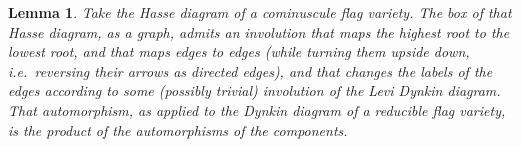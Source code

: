 \documentclass[a4paper,10pt]{amsart}
\newtheorem{lemma}{Lemma}
\theoremstyle{remark}
\begin{document}
\begin{lemma}
Take the Hasse diagram of a cominuscule flag variety.
The box of that Hasse diagram, as a graph, admits an involution that maps the highest root to the lowest root, and that maps edges to edges (while turning them upside down, i.e.\ reversing their arrows as directed edges), and that changes the labels of the edges according to some (possibly trivial) involution of the Levi Dynkin diagram. 
That automorphism, as applied to the Dynkin diagram of a reducible flag variety, is the product of the automorphisms of the components.
\end{lemma}
\end{document}
